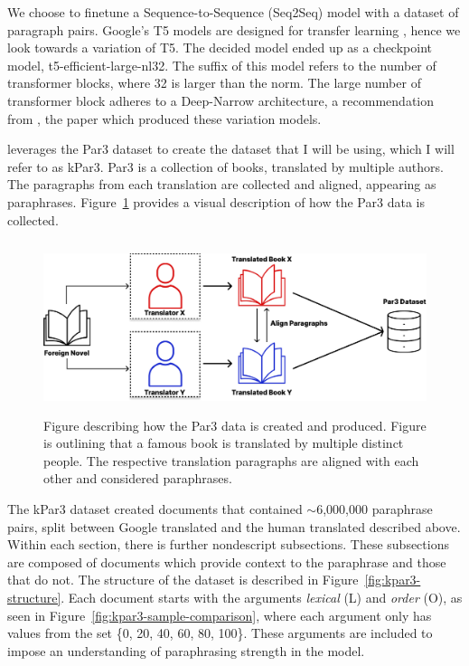 \documentclass{l4proj}
\theoremstyle{definition}
\newcommand{\codefont}[1]{{\fontfamily{lmtt}\selectfont #1}}
\begin{document}
        We choose to finetune a Sequence-to-Sequence (Seq2Seq) model with a dataset of paragraph pairs. Google's T5 models are designed for transfer learning \citep{raffel2023exploring}, hence we look towards a variation of T5. The decided model ended up as a checkpoint model, \codefont{t5-efficient-large-nl32}. The suffix of this model refers to the number of transformer blocks, where 32 is larger than the norm. The large number of transformer block adheres to a Deep-Narrow architecture, a recommendation from \citet{tay2022scale}, the paper which produced these variation models.

        \citet{krishna2023paraphrasing} leverages the Par3 dataset \citet{Par3_2022} to create the dataset that I will be using, which I will refer to as kPar3. Par3 is a collection of books, translated by multiple authors. The paragraphs from each translation are collected and aligned, appearing as paraphrases. Figure~\ref{fig:par3-collection-process} provides a visual description of how the Par3 data is collected.

        

        \begin{figure}[ht]
            \centering
            \includegraphics[width=1\linewidth, height=5cm, keepaspectratio]{images/methods/par3-collection-explanation.pdf}
            \caption{Figure describing how the Par3 data is created and produced. Figure is outlining that a famous book is translated by multiple distinct people. The respective translation paragraphs are aligned with each other and considered paraphrases.}
            \label{fig:par3-collection-process}
        \end{figure}

        The kPar3 dataset created documents that contained $\sim$6,000,000 paraphrase pairs, split between Google translated and the human translated described above. Within each section, there is further nondescript subsections. These subsections are composed of documents which provide context to the paraphrase and those that do not. The structure of the dataset is described in Figure~\ref{fig:kpar3-structure}. Each document starts with the arguments \emph{lexical} (L) and \emph{order} (O), as seen in Figure~\ref{fig:kpar3-sample-comparison}, where each argument only has values from the set \{0, 20, 40, 60, 80, 100\}. These arguments are included to impose an understanding of paraphrasing strength in the model.
\end{document}
